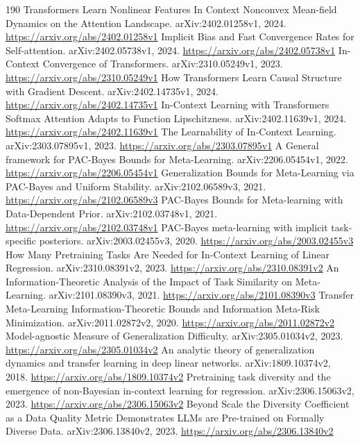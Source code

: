 \documentclass[11pt]{article}
\begin{document}
\begin{thebibliography}{190}
 Transformers Learn Nonlinear Features In Context Nonconvex Mean-field Dynamics on the Attention Landscape. arXiv:2402.01258v1, 2024. \url{https://arxiv.org/abs/2402.01258v1}
 Implicit Bias and Fast Convergence Rates for Self-attention. arXiv:2402.05738v1, 2024. \url{https://arxiv.org/abs/2402.05738v1}
 In-Context Convergence of Transformers. arXiv:2310.05249v1, 2023. \url{https://arxiv.org/abs/2310.05249v1}
 How Transformers Learn Causal Structure with Gradient Descent. arXiv:2402.14735v1, 2024. \url{https://arxiv.org/abs/2402.14735v1}
 In-Context Learning with Transformers Softmax Attention Adapts to Function Lipschitzness. arXiv:2402.11639v1, 2024. \url{https://arxiv.org/abs/2402.11639v1}
 The Learnability of In-Context Learning. arXiv:2303.07895v1, 2023. \url{https://arxiv.org/abs/2303.07895v1}
 A General framework for PAC-Bayes Bounds for Meta-Learning. arXiv:2206.05454v1, 2022. \url{https://arxiv.org/abs/2206.05454v1}
 Generalization Bounds for Meta-Learning via PAC-Bayes and Uniform Stability. arXiv:2102.06589v3, 2021. \url{https://arxiv.org/abs/2102.06589v3}
 PAC-Bayes Bounds for Meta-learning with Data-Dependent Prior. arXiv:2102.03748v1, 2021. \url{https://arxiv.org/abs/2102.03748v1}
 PAC-Bayes meta-learning with implicit task-specific posteriors. arXiv:2003.02455v3, 2020. \url{https://arxiv.org/abs/2003.02455v3}
 How Many Pretraining Tasks Are Needed for In-Context Learning of Linear Regression. arXiv:2310.08391v2, 2023. \url{https://arxiv.org/abs/2310.08391v2}
 An Information-Theoretic Analysis of the Impact of Task Similarity on Meta-Learning. arXiv:2101.08390v3, 2021. \url{https://arxiv.org/abs/2101.08390v3}
 Transfer Meta-Learning Information-Theoretic Bounds and Information Meta-Risk Minimization. arXiv:2011.02872v2, 2020. \url{https://arxiv.org/abs/2011.02872v2}
 Model-agnostic Measure of Generalization Difficulty. arXiv:2305.01034v2, 2023. \url{https://arxiv.org/abs/2305.01034v2}
 An analytic theory of generalization dynamics and transfer learning in deep linear networks. arXiv:1809.10374v2, 2018. \url{https://arxiv.org/abs/1809.10374v2}
 Pretraining task diversity and the emergence of non-Bayesian in-context learning for regression. arXiv:2306.15063v2, 2023. \url{https://arxiv.org/abs/2306.15063v2}
 Beyond Scale the Diversity Coefficient as a Data Quality Metric Demonstrates LLMs are Pre-trained on Formally Diverse Data. arXiv:2306.13840v2, 2023. \url{https://arxiv.org/abs/2306.13840v2}

\end{thebibliography}
\end{document}
